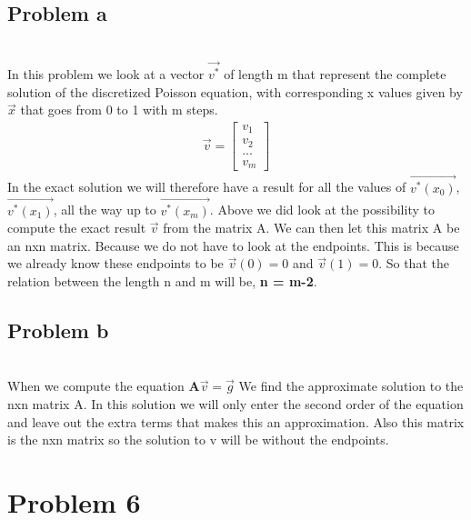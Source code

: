 \documentclass[english,notitlepage]{revtex4-1}  %
\begin{document}
 \subsection*{Problem a}\
 \\
In this problem we look at a vector $\vec{v^*}$ of length m that represent the complete solution of the discretized Poisson equation, with corresponding x values given by $\vec{x}$ that goes from 0 to 1 with m steps.
\begin{align*}
\vec{v} = \begin{bmatrix}
v_1 \\
v_2 \\
... \\
v_m
\end{bmatrix}
\end{align*}
In the exact solution we will therefore have a result for all the values of $\vec{v^*(x_0)}$, $\vec{v^*(x_1)}$, all the way up to $\vec{v^*(x_m)}$.
Above we did look at the possibility to compute the exact result $\vec{v}$ from the matrix A. We can then let this matrix A be an nxn matrix. Because we do not have to look at the endpoints. This is because we already know these endpoints to be $\vec{v}(0) = 0$ and $\vec{v}(1) = 0$. So that the relation between the length n and m will be, \textbf{n = m-2}.



 \subsection*{Problem b}\
 \\
 When we compute the equation $\mathbf{A} \vec{v} = \vec{g}$ We find the approximate solution to the nxn matrix A. In this solution we will only enter the second order of the equation and leave out the extra terms that makes this an approximation. Also this matrix is the nxn matrix so the solution to v will be without the endpoints.




 \section*{Problem 6}
\end{document}
